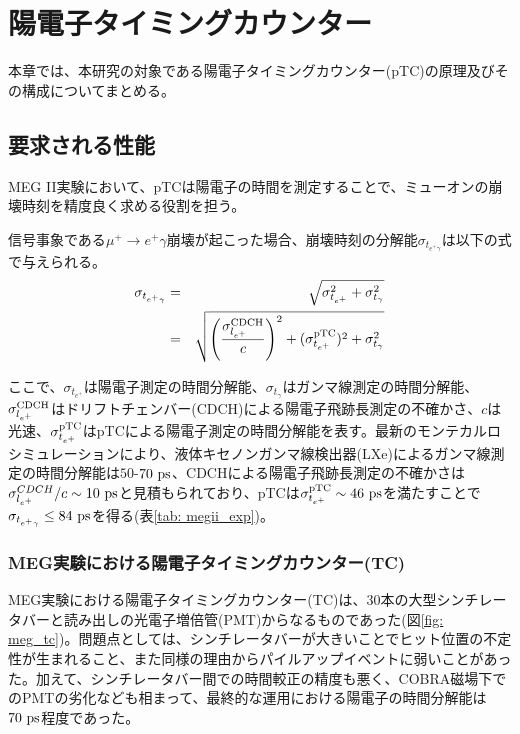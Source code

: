 \documentclass[Yonemoto_master.tex]{subfiles}
\begin{document}
\chapter{陽電子タイミングカウンター}
\label{chap: ptc}
本章では、本研究の対象である陽電子タイミングカウンター(pTC)の原理及びその構成についてまとめる。
\section{要求される性能}

MEG II実験において、pTCは陽電子の時間を測定することで、ミューオンの崩壊時刻を精度良く求める役割を担う。

信号事象である$\mu^+ \to e^+\gamma$崩壊が起こった場合、崩壊時刻の分解能$\sigma_{t_{e^+\gamma}}$は以下の式で与えられる。 \\

\begin{eqnarray}
\sigma_{t_{e^+\gamma}} & = & \sqrt{\sigma_{t_{e^+}}^2 + \sigma_{t_{\gamma}}^2} \nonumber \\ 
& = & \sqrt{\left( \frac{\sigma_{l_{e^+}}^{\rm CDCH}}{c} \right)^2 + (\sigma_{t_{e^+}}^{\rm pTC})^2 + \sigma_{t_{\gamma}}^2}
\end{eqnarray}

ここで、$\sigma_{t_{e^+}}$は陽電子測定の時間分解能、$\sigma_{t_{\gamma}}$はガンマ線測定の時間分解能、$\sigma_{l_{e^+}}^{\rm CDCH}$はドリフトチェンバー(CDCH)による陽電子飛跡長測定の不確かさ、$c$は光速、$\sigma_{t_{e^+}}^{\rm pTC}$はpTCによる陽電子測定の時間分解能を表す。最新のモンテカルロシミュレーションにより、液体キセノンガンマ線検出器(LXe)によるガンマ線測定の時間分解能は$50$-$70\ \rm ps$、CDCHによる陽電子飛跡長測定の不確かさは$\sigma_{l_{e^+}}^{CDCH}/c \sim 10 \ \rm ps$と見積もられており、pTCは$\sigma_{t_{e^+}}^{\rm pTC} \sim 46 \ \rm ps$を満たすことで$\sigma_{t_{e^+\gamma}} \le 84 \ \rm ps$を得る(表\ref{tab: megii_exp})。

\subsection{MEG実験における陽電子タイミングカウンター(TC)}
MEG実験における陽電子タイミングカウンター(TC)は、30本の大型シンチレータバーと読み出しの光電子増倍管(PMT)からなるものであった(図\ref{fig: meg_tc})。問題点としては、シンチレータバーが大きいことでヒット位置の不定性が生まれること、また同様の理由からパイルアップイベントに弱いことがあった。加えて、シンチレータバー間での時間較正の精度も悪く、COBRA磁場下でのPMTの劣化なども相まって、最終的な運用における陽電子の時間分解能は$70 \ \rm ps$程度であった。
\end{document}

